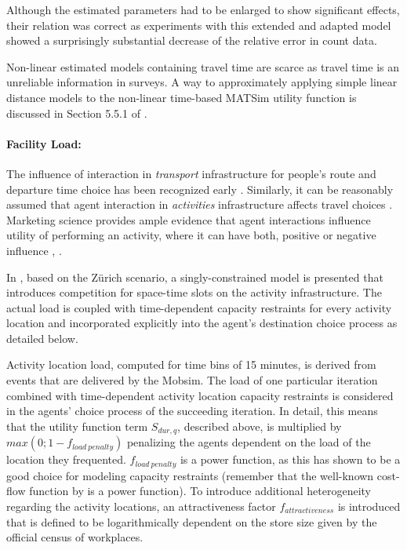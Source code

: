 Although the estimated parameters had to be enlarged to show significant effects, their relation was correct as experiments with this extended and adapted model showed a surprisingly substantial decrease of the relative error in count data.

Non-linear estimated models containing travel time are scarce as travel time is an unreliable information in surveys. A way to approximately applying simple linear distance models to the non-linear time-based MATSim utility function is discussed in Section 5.5.1 of \citet[][]{Horni_PhDThesis_2013}.

\paragraph{Facility Load:}
The influence of interaction in \emph{transport} infrastructure for people's route and departure time choice has been recognized early \citep[e.\,g.,][]{Pigou_1920, Knight_QJE_1924, Wardrop_PICE_1952}. Similarly, it can be reasonably assumed that agent interaction in \emph{activities} infrastructure affects travel choices \citep[][]{Axhausen_SSRL_2006}. Marketing science provides ample evidence that agent interactions influence utility of performing an activity, where it can have both, positive or negative influence \citep[][p.331]{BakerJEtAl_JAMS_1994}, \citep[][]{ErogluAndHarrell_JR_1986, ErogluAndMachleit_JR_1990, ErogluEtAl_JBR_2005, HarrellEtAl_JMR_1980, HuiAndBateson_JCR_1991, PonsEtAl_PsychMark_2006}.

In \citet[][]{HorniEtAl_TRR_2009}, based on the Zürich scenario, a singly-constrained model is presented that introduces competition for space-time slots on the activity infrastructure. The actual load is coupled with time-dependent capacity restraints for every activity location and incorporated explicitly into the agent's destination choice process as detailed below. 

Activity location load, computed for time bins of 15 minutes, is derived from events that are delivered by the Mobsim. The load of one particular iteration combined with time-dependent activity location capacity restraints is considered in the agents' choice process of the succeeding iteration. In detail, this means that the utility function term $S_{dur,q}$, described above, is multiplied by $max(0; 1 - f_{load\ penalty})$ penalizing the agents dependent on the load of the location they frequented. $f_{load\ penalty}$ is a power function, as this has shown to be a good choice for modeling capacity restraints (remember that the well-known cost-flow function by \citet[][]{TA_manual_1964} is a power function). To introduce additional heterogeneity regarding the activity locations, an attractiveness factor $f_{attractiveness}$ is introduced that is defined to be logarithmically dependent on the store size given by the official census of workplaces.

